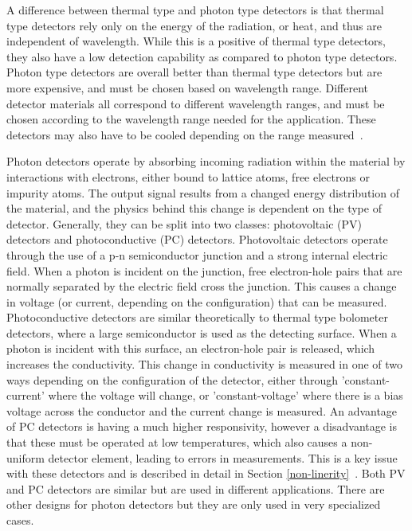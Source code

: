 A difference between thermal type and photon type detectors is that thermal type detectors rely only on the energy of the radiation, or heat, and thus are independent of wavelength. While this is a positive of thermal type detectors, they also have a low detection capability as compared to photon type detectors. Photon type detectors are overall better than thermal type detectors but are more expensive, and must be chosen based on wavelength range. Different detector materials all correspond to different wavelength ranges, and must be chosen according to the wavelength range needed for the application. These detectors may also have to be cooled depending on the range measured~\citep{hamamatsu_ir_detectors}.

Photon detectors operate by absorbing incoming radiation within the material by interactions with electrons, either bound to lattice atoms, free electrons or impurity atoms. The output signal results from a changed energy distribution of the material, and the physics behind this change is dependent on the type of detector. Generally, they can be split into two classes: photovoltaic (PV) detectors and photoconductive (PC) detectors. Photovoltaic detectors operate through the use of a p-n semiconductor junction and a strong internal electric field. When a photon is incident on the junction, free electron-hole pairs that are normally separated by the electric field cross the junction. This causes a change in voltage (or current, depending on the configuration) that can be measured. Photoconductive detectors are similar theoretically to thermal type bolometer detectors, where a large semiconductor is used as the detecting surface. When a photon is incident with this surface, an electron-hole pair is released, which increases the conductivity. This change in conductivity is measured in one of two ways depending on the configuration of the detector, either through 'constant-current' where the voltage will change, or 'constant-voltage' where there is a bias voltage across the conductor and the current change is measured. An advantage of PC detectors is having a much higher responsivity, however a disadvantage is that these must be operated at low temperatures, which also causes a non-uniform detector element, leading to errors in measurements. This is a key issue with these detectors and is described in detail in Section \ref{non-linerity}~\citep{IR_detector_textbook}. Both PV and PC detectors are similar but are used in different applications. There are other designs for photon detectors but they are only used in very specialized cases.

